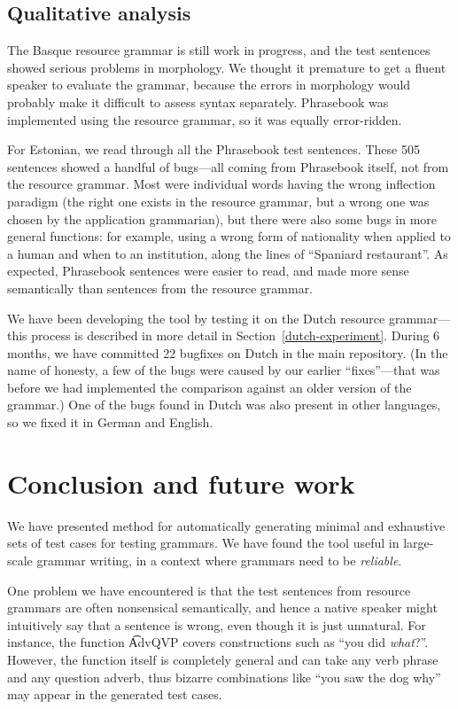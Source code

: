 \subsection{Qualitative analysis}

The Basque resource grammar is still work in progress, and the test
sentences showed serious problems in morphology. We thought it
premature to get a fluent speaker to evaluate the grammar, because the
errors in morphology would probably make it difficult to assess syntax
separately. Phrasebook was implemented using the resource grammar, so
it was equally error-ridden.

For Estonian, we read through all the Phrasebook test sentences. These
505 sentences showed a handful of bugs---all coming from Phrasebook
itself, not from the resource grammar. Most were individual words
having the wrong inflection paradigm (the right one exists in the
resource grammar, but a wrong one was chosen by the application
grammarian), but there were also some bugs in more general
functions: for example, using a wrong form of nationality when applied
to a human and when to an institution, along the lines of ``Spaniard
restaurant''. As expected, Phrasebook sentences were easier to read,
and made more sense semantically than sentences from the resource
grammar.

We have been developing the tool by testing it on the Dutch resource
grammar---this process is described in more detail in
Section~\ref{dutch-experiment}. During 6 months, we have committed 22
bugfixes on Dutch in the \gf{} main repository. (In the name of
honesty, a few of the bugs were caused by our earlier “fixes”—that was
before we had implemented the comparison against an older version of
the grammar.) One of the bugs found in Dutch was also present in other
languages, so we fixed it in German and English.



\section{Conclusion and future work}
\label{gf-future}

We have presented method for automatically generating minimal and
exhaustive sets of test cases for testing grammars.  We have found the
tool useful in large-scale grammar writing, in a context where
grammars need to be \emph{reliable}.

One problem we have encountered is that the test sentences from
resource grammars are often nonsensical semantically, and hence a
native speaker might intuitively say that a sentence is wrong, even
though it is just unnatural.  For instance, the function \t{AdvQVP}
covers constructions such as ``you did \emph{what}?''. However, the
function itself is completely general and can take any verb phrase and
any question adverb, thus bizarre combinations like ``you saw the dog
why''  may appear in the generated test cases.

